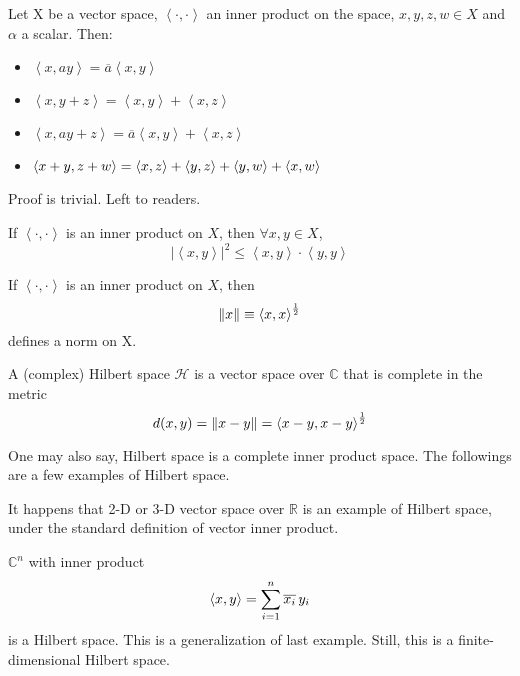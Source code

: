 \begin{proposition}\rm\nextline
	Let X be a vector space, $\left<\cdot,\cdot\right>$ an inner product on the space, $x,y,z,w\in X$ and $\alpha$ a scalar. Then:
	\begin{itemize}
		\item $\left<x,ay\right>={\overline{a}}\left<x,y\right>$
		\item $\left<x,y+z\right>=\left<x,y\right>+\left<x,z\right>$
		\item $\left<x,ay+z\right>={\overline{a} }\left<x,y\right>+\left<x,z\right>$
		\item $\left<{x+y},{z+w}\right>=\left<{x},{z}\right>+\left<{y},{z}\right>+\left<{y},{w}\right>+\left<{x},{w}\right>$
	\end{itemize}
	Proof is trivial. Left to readers.
\end{proposition}

\begin{proposition}\rm\nextline
	If $\left<\cdot,\cdot\right>$ is an inner product on $X$,
	then $\forall x,y\in X$,
	$$|\left<x,y\right>|^2\leq\left<x,y\right>\cdot\left<y,y\right>$$

\end{proposition}

\begin{proposition}\rm\nextline
	If $\left<\cdot,\cdot\right>$ is an inner product on $X$,
	then
	$$
		\left\|{x}\right\|\equiv\left<{x},{x}\right>^\frac{1}{2}
	$$
	defines a norm on X.
\end{proposition}

\begin{definition}\rm\label{Hilbert space def}\nextline
	A (complex) Hilbert space $\mathscr{H}$ is a vector space over $\mathbb C$ that is complete in the metric
	$$
		d(x,y)=\left\|{x-y}\right\|=\left<{x-y},{x-y}\right>^\frac{1}{2}
	$$
\end{definition}
One may also say, Hilbert space is a complete inner product space. The followings are a few examples of Hilbert space.

\begin{example}\rm\nextline
	It happens that 2-D or 3-D vector space over $\mathbb R$ is an example of Hilbert space, under the standard definition of vector inner product.
\end{example}

\begin{example}\rm\nextline
	${\mathbb C}^n$ with inner product
	$$
		\left<{x},{y}\right>=\sum_{i=1}^n {\overline{x_i}}\,y_i
	$$
	is a Hilbert space. This is a generalization of last example. Still, this is a finite-dimensional Hilbert space.
\end{example}

